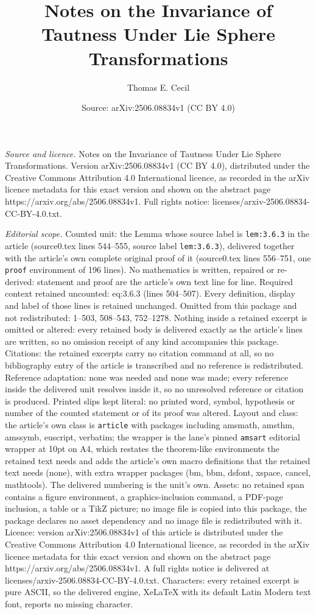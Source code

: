\documentclass[10pt,a4paper]{amsart}
\title[Notes on the Invariance of Tautness Under Lie Sphere Transfo]{Notes on the Invariance of Tautness Under Lie Sphere Transformations}
\author{Thomas E. Cecil}
\date{Source: arXiv:2506.08834v1 (CC BY 4.0)}
\begin{document}
\maketitle

\noindent\emph{Source and licence.} Notes on the Invariance of Tautness Under Lie Sphere Transformations. Version arXiv:2506.08834v1 (CC BY 4.0), distributed under the Creative Commons Attribution 4.0 International licence, as recorded in the arXiv licence metadata for this exact version and shown on the abstract page https://arxiv.org/abs/2506.08834v1. Full rights notice: licenses/arxiv-2506.08834-CC-BY-4.0.txt.\par\smallskip

\noindent\textit{Editorial scope.} Counted unit: the Lemma whose source label is \texttt{lem:3.6.3} in the article (source0.tex lines 544--555, source label \texttt{lem:3.6.3}), delivered together with the article's own complete original proof of it (source0.tex lines 556--751, one \texttt{proof} environment of 196 lines). No mathematics is written, repaired or re-derived: statement and proof are the article's own text line for line. Required context retained uncounted: eq:3.6.3 (lines 504--507). Every definition, display and label of those lines is retained unchanged. Omitted from this package and not redistributed: 1--503, 508--543, 752--1278. Nothing inside a retained excerpt is omitted or altered: every retained body is delivered exactly as the article's lines are written, so no omission receipt of any kind accompanies this package. Citations: the retained excerpts carry no citation command at all, so no bibliography entry of the article is transcribed and no reference is redistributed. Reference adaptation: none was needed and none was made; every reference inside the delivered unit resolves inside it, so no unresolved reference or citation is produced. Printed slips kept literal: no printed word, symbol, hypothesis or number of the counted statement or of its proof was altered. Layout and class: the article's own class is \texttt{article} with packages including amsmath, amsthm, amssymb, euscript, verbatim; the wrapper is the lane's pinned \texttt{amsart} editorial wrapper at 10pt on A4, which restates the theorem-like environments the retained text needs and adds the article's own macro definitions that the retained text needs (none), with extra wrapper packages (bm, bbm, dsfont, xspace, cancel, mathtools). The delivered numbering is the unit's own. Assets: no retained span contains a figure environment, a graphics-inclusion command, a PDF-page inclusion, a table or a TikZ picture; no image file is copied into this package, the package declares no asset dependency and no image file is redistributed with it. Licence: version arXiv:2506.08834v1 of this article is distributed under the Creative Commons Attribution 4.0 International licence, as recorded in the arXiv licence metadata for this exact version and shown on the abstract page https://arxiv.org/abs/2506.08834v1. A full rights notice is delivered at licenses/arxiv-2506.08834-CC-BY-4.0.txt. Characters: every retained excerpt is pure ASCII, so the delivered engine, XeLaTeX with its default Latin Modern text font, reports no missing character.
\end{document}
